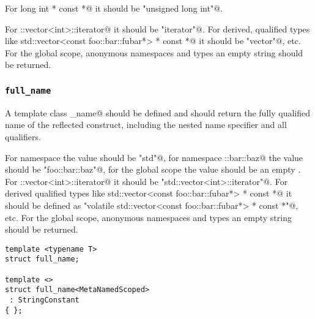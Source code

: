 For \verb@unsigned long int * const *@ it should be \verb@"unsigned long int"@.

For \verb@std::vector<int>::iterator@ it should be \verb@"iterator"@. For derived,
qualified types like \verb@volatile std::vector<const foo::bar::fubar*> * const *@
it should be \verb@"vector"@, etc. For the global scope, anonymous namespaces and types
an empty string should be returned.

\subsubsection{\texttt{full\_name}}

A template class \verb@full_name@ should be defined and should return the fully
qualified name of the reflected construct, including the nested name specifier
and all qualifiers.

For namespace \verb@std@ the value 
should be \verb@"std"@, for namespace \verb@foo::bar::baz@ the value should
be \verb@"foo::bar::baz"@, for the global scope the value should be an empty
.
For \verb@std::vector<int>::iterator@ it should be \verb@"std::vector<int>::iterator"@.
For derived qualified types like
\verb@volatile std::vector<const foo::bar::fubar*> * const *@ it should be defined as
\verb@"volatile std::vector<const foo::bar::fubar*> * const *"@, etc.
For the global scope, anonymous namespaces and types an empty string should be returned.

\begin{verbatim}
template <typename T>
struct full_name;

template <>
struct full_name<MetaNamedScoped>
 : StringConstant
{ };
\end{verbatim}

